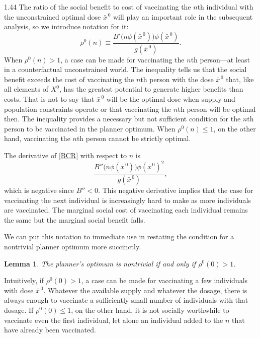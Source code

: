 \documentclass[12pt]{article}
\newcommand{\efficacy}{\phi}
\newcommand{\general}{g}
\newcommand{\benefit}{B}
\newcommand{\ratio}{\rho^0\!}
\newcommand{\Xno}{X^{0}}
\newcommand{\xnobar}{\bar{x}^{\,0}}
\newtheorem{lemma}{Lemma}
\begin{document}
\begin{spacing}{1.44}
The ratio of the social benefit to cost of vaccinating the $n$th
individual with the unconstrained optimal dose $\xnobar$ will play an
important role in the subsequent analysis, so we introduce notation
for it:
\begin{equation}
\label{BCR}
\ratio(n) \equiv \frac{\benefit' \! \bigl( n \efficacy(\xnobar) \bigr)
  \efficacy(\xnobar)}{\general(\xnobar)}.
\end{equation} 
When $\ratio(n) > 1$, a case can be made for vaccinating the $n$th
person---at least in a counterfactual unconstrained world. The
inequality tells us that the social benefit exceeds the cost of
vaccinating the $n$th person with the dose $\xnobar$ that, like all
elements of $\Xno$, has the greatest potential to generate higher
benefits than costs. That is not to say that $\xnobar$ will be the
optimal dose when supply and population constraints operate or that
vaccinating the $n$th person will be optimal then. The inequality
provides a necessary but not sufficient condition for the $n$th person
to be vaccinated in the planner optimum. When $\ratio(n) \leq 1$, on
the other hand, vaccinating the $n$th person cannot be strictly
optimal.

The derivative of \eqref{BCR} with respect to $n$ is 
\begin{equation}
\label{dBCR}
\frac{\benefit'' \! \bigl( n \efficacy(\xnobar) \bigr)
  \efficacy(\xnobar)^2}{\general(\xnobar)},
\end{equation}
which is negative since $\benefit'' < 0$. This negative derivative
implies that the case for vaccinating the next individual is
increasingly hard to make as more individuals are vaccinated. The
marginal social cost of vaccinating each individual remains the same
but the marginal social benefit falls.

We can put this notation to immediate use in restating the condition
for a nontrivial planner optimum more succinctly.
\begin{lemma}
\label{l:nontrivial}
\singlespace
The planner's optimum is nontrivial if and only if $\ratio(0) > 1$.
\end{lemma}

\noindent Intuitively, if $\ratio(0) > 1$, a case can be made for
vaccinating a few individuals with dose $\xnobar$. Whatever the
available supply and whatever the dosage, there is always enough to
vaccinate a sufficiently small number of individuals with that
dosage. If $\ratio(0) \leq 1$, on the other hand, it is not socially
worthwhile to vaccinate even the first individual, let alone an
individual added to the $n$ that have already been vaccinated.


\end{spacing}
\end{document}
